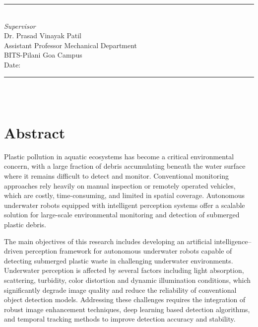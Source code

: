 \documentclass[12pt,a4paper]{report}
\begin{document}
\noindent
\begin{minipage}[t]{0.45\textwidth}
    \vspace{0pt} %
    \rule{\textwidth}{0.5pt} \\[2mm] %
    \textit{Supervisor} \\[1mm]
    Dr. Prasad Vinayak Patil \\
    Assistant Professor Mechanical Department \\
    BITS-Pilani Goa Campus \\
    Date:
\end{minipage}%
\hfill
\begin{minipage}[t]{0.45\textwidth}
    \vspace{0pt}
    \rule{\textwidth}{0.5pt} \\[2mm] %
    ~ %
\end{minipage}

\clearpage

\chapter*{Abstract}

Plastic pollution in aquatic ecosystems has become a critical environmental concern, with a large fraction of debris accumulating beneath the water surface where it remains difficult to detect and monitor. Conventional monitoring approaches rely heavily on manual inspection or remotely operated vehicles, which are costly, time-consuming, and limited in spatial coverage. Autonomous underwater robots equipped with intelligent perception systems offer a scalable solution for large-scale environmental monitoring and detection of submerged plastic debris.

The main objectives of this research includes developing an artificial intelligence–driven perception framework for autonomous underwater robots capable of detecting submerged plastic waste in challenging underwater environments. Underwater perception is affected by several factors including light absorption, scattering, turbidity, color distortion and dynamic illumination conditions, which significantly degrade image quality and reduce the reliability of conventional object detection models. Addressing these challenges requires the integration of robust image enhancement techniques, deep learning based detection algorithms, and temporal tracking methods to improve detection accuracy and stability.
\end{document}
